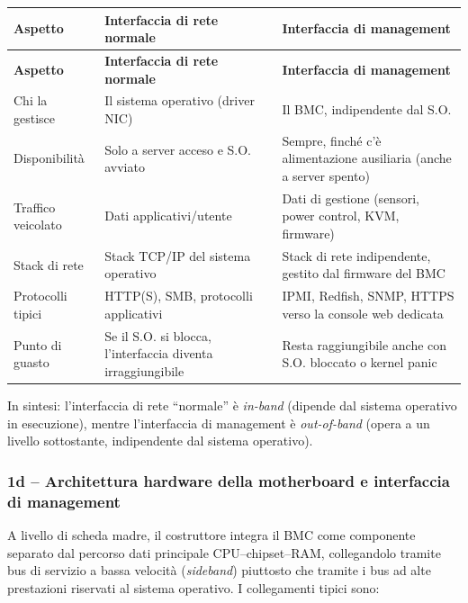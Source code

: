 \documentclass[11pt,a4paper]{article}
\begin{document}
\begin{center}
\begin{longtable}{p{4.8cm}p{4.6cm}p{4.6cm}}
\toprule
\textbf{Aspetto} & \textbf{Interfaccia di rete normale} & \textbf{Interfaccia di management} \\
\midrule
\endfirsthead
\toprule
\textbf{Aspetto} & \textbf{Interfaccia di rete normale} & \textbf{Interfaccia di management} \\
\midrule
\endhead
Chi la gestisce & Il sistema operativo (driver NIC) & Il BMC, indipendente dal S.O. \\
Disponibilità & Solo a server acceso e S.O. avviato & Sempre, finché c'è alimentazione ausiliaria (anche a server spento) \\
Traffico veicolato & Dati applicativi/utente & Dati di gestione (sensori, power control, KVM, firmware) \\
Stack di rete & Stack TCP/IP del sistema operativo & Stack di rete indipendente, gestito dal firmware del BMC \\
Protocolli tipici & HTTP(S), SMB, protocolli applicativi & IPMI, Redfish, SNMP, HTTPS verso la console web dedicata \\
Punto di guasto & Se il S.O. si blocca, l'interfaccia diventa irraggiungibile & Resta raggiungibile anche con S.O. bloccato o kernel panic \\
\bottomrule
\end{longtable}
\end{center}

In sintesi: l'interfaccia di rete ``normale'' è \emph{in-band} (dipende dal sistema operativo in esecuzione), mentre l'interfaccia di management è \emph{out-of-band} (opera a un livello sottostante, indipendente dal sistema operativo).

\subsubsection{1d -- Architettura hardware della motherboard e interfaccia di management}

A livello di scheda madre, il costruttore integra il BMC come componente separato dal percorso dati principale CPU--chipset--RAM, collegandolo tramite bus di servizio a bassa velocità (\emph{sideband}) piuttosto che tramite i bus ad alte prestazioni riservati al sistema operativo. I collegamenti tipici sono:
\end{document}
